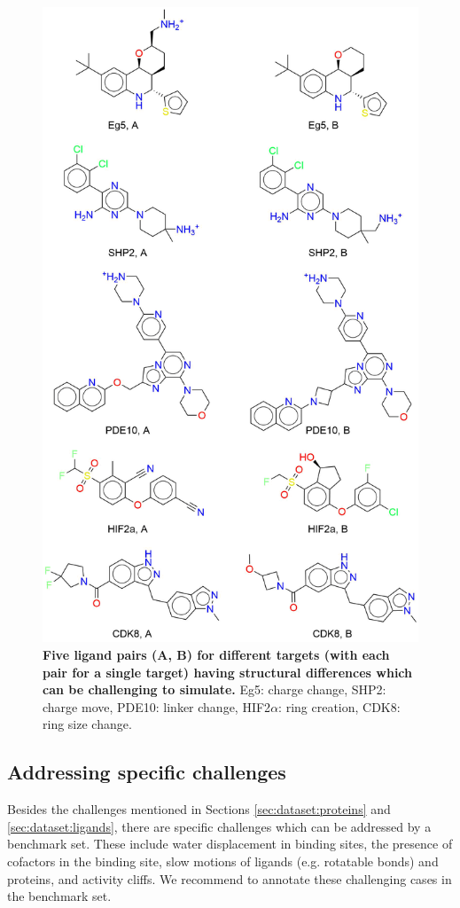 \documentclass[9pt,bestpractices]{livecoms}
\begin{document}
\begin{figure}
    \centering
    \includegraphics[width=.48\textwidth]{dataset/difficult_perturbations.png}
    \caption{\textbf{Five ligand pairs (A, B) for different targets (with each pair for a single target)
    having structural differences which can be challenging to simulate.}
    Eg5: charge change,
    SHP2: charge move,
    PDE10: linker change,
    HIF2$\alpha$: ring creation,
    CDK8: ring size change. 
    }
    \label{fig:difficult_perturbations}
\end{figure}

\subsection{Addressing specific challenges}
\label{sec:dataset:challenges}

Besides the challenges mentioned in Sections \ref{sec:dataset:proteins} and \ref{sec:dataset:ligands},
there are specific challenges which can be addressed by a benchmark set. These include 
water displacement in binding sites,
the presence of cofactors in the binding site, 
slow motions of ligands (e.g. rotatable bonds) and proteins, and 
activity cliffs.
We recommend to annotate these challenging cases in the benchmark set.

\end{document}

